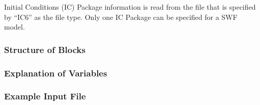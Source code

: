 Initial Conditions (IC) Package information is read from the file that is specified by ``IC6'' as the file type.  Only one IC Package can be specified for a SWF model. 

\vspace{5mm}
\subsubsection{Structure of Blocks}
%


\vspace{5mm}
\subsubsection{Explanation of Variables}
\begin{description}

\end{description}

\vspace{5mm}
\subsubsection{Example Input File}


